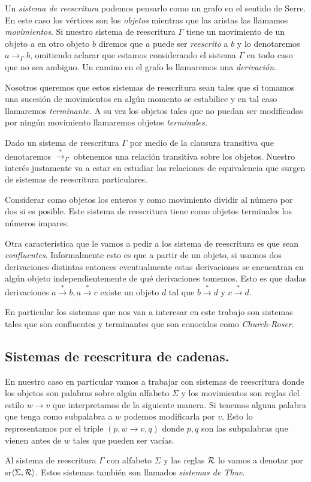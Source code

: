 \documentclass[tesis.tex]{subfiles}
\begin{document}
Un \emph{sistema de reescritura} podemos pensarlo como un grafo en el sentido de Serre. 
En este caso los vértices son los \emph{objetos} mientras que las aristas las llamamos \emph{movimientos}. 
Si nuestro sistema de reescritura $\Gamma$ tiene un movimiento de un objeto $a$ en otro objeto $b$ diremos que $a$ puede ser \emph{reescrito} a $b$ y lo denotaremos $a \to_{\Gamma} b$, omitiendo aclarar que estamos considerando el sistema $\Gamma$ en todo caso que no sea ambiguo. 
Un camino en el grafo lo llamaremos una \emph{derivación}.  

Nosotros queremos que estos sistemas de reescritura sean tales que si tomamos una sucesión de movimientos en algún momento se estabilice y en tal caso llamaremos \emph{terminante.} 
A su vez los objetos tales que no puedan ser modificados por ningún movimiento llamaremos objetos \emph{terminales.} 

Dado un sistema de reescritura $\Gamma$ por medio de la clausura transitiva que denotaremos $\overset{*}{\rightarrow}_{\Gamma}$ obtenemos una relación transitiva sobre los objetos. 
Nuestro interés justamente va a estar en estudiar las relaciones de equivalencia que surgen de sistemas de reescritura particulares. 

\begin{ej}
	Considerar como objetos los enteros y como movimiento dividir al número por dos si es posible. Este sistema de reescritura tiene como objetos terminales los números impares.
\end{ej}

Otra característica que le vamos a pedir a los sistema de reescritura es que sean \emph{confluentes}. 
Informalmente esto es que a partir de un objeto, si usamos dos derivaciones distintas entonces eventualmente estas derivaciones se encuentran en algún objeto independientemente de qué derivaciones tomemos. 
Esto es que dadas derivaciones $a \overset{*}{\rightarrow} b, a \overset{*}{\rightarrow} c$ existe un objeto $d$ tal que $b \overset{*}{\rightarrow} d$ y $c \overset{*}{\rightarrow} d$.

En particular los sistemas que nos van a interesar en este trabajo son sistemas tales que son confluentes y terminantes que son conocidos como \emph{Church-Roser}.

\subsection{Sistemas de reescritura de cadenas.}
En nuestro caso en particular vamos a trabajar con sistemas de reescritura donde los objetos son palabras sobre algún alfabeto $\Sigma$ y los movimientos son reglas del estilo $w \to v$ que interpretamos de la siguiente manera. 
Si tenemos alguna palabra que tenga como subpalabra a $w$ podemos modificarla por $v$. 
Esto lo representamos por el triple $(p, w \to v, q)$ donde $p,q$ son las subpalabras que vienen antes de $w$ tales que pueden ser vacías. 

Al sistema de reescritura $\Gamma$ con alfabeto $\Sigma$ y las reglas $\cal R$ lo vamos a denotar por sr$\left< \Sigma, {\cal R} \right>$. Estos sistemas también son llamados \emph{sistemas de Thue}.
\end{document}

